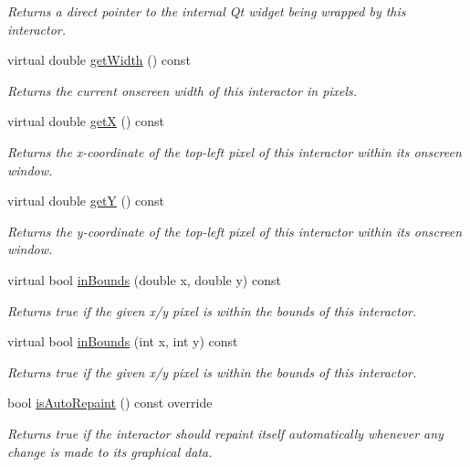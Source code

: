 \begin{DoxyCompactItemize}
\begin{DoxyCompactList}\small\item\em Returns a direct pointer to the internal Qt widget being wrapped by this interactor. \end{DoxyCompactList}\item 
virtual double \mbox{\hyperlink{classsgl_1_1GInteractor_a0ed2965abd4f5701d2cadf71239faf19}{get\+Width}} () const
\begin{DoxyCompactList}\small\item\em Returns the current onscreen width of this interactor in pixels. \end{DoxyCompactList}\item 
virtual double \mbox{\hyperlink{classsgl_1_1GInteractor_a344385751bee0720059403940d57a13e}{getX}} () const
\begin{DoxyCompactList}\small\item\em Returns the x-\/coordinate of the top-\/left pixel of this interactor within its onscreen window. \end{DoxyCompactList}\item 
virtual double \mbox{\hyperlink{classsgl_1_1GInteractor_aafa51c7f8f38a09febbb9ce7853f77b4}{getY}} () const
\begin{DoxyCompactList}\small\item\em Returns the y-\/coordinate of the top-\/left pixel of this interactor within its onscreen window. \end{DoxyCompactList}\item 
virtual bool \mbox{\hyperlink{classsgl_1_1GInteractor_afc480f652b8c5f1fb255e2269ce68879}{in\+Bounds}} (double x, double y) const
\begin{DoxyCompactList}\small\item\em Returns true if the given x/y pixel is within the bounds of this interactor. \end{DoxyCompactList}\item 
virtual bool \mbox{\hyperlink{classsgl_1_1GInteractor_ae6d7982c1c627b677a5e776ca86118ed}{in\+Bounds}} (int x, int y) const
\begin{DoxyCompactList}\small\item\em Returns true if the given x/y pixel is within the bounds of this interactor. \end{DoxyCompactList}\item 
bool \mbox{\hyperlink{classsgl_1_1GCanvas_a189881032e2b355095790b83b2454d8d}{is\+Auto\+Repaint}} () const override
\begin{DoxyCompactList}\small\item\em Returns true if the interactor should repaint itself automatically whenever any change is made to its graphical data. \end{DoxyCompactList}\item 

\end{DoxyCompactItemize}
